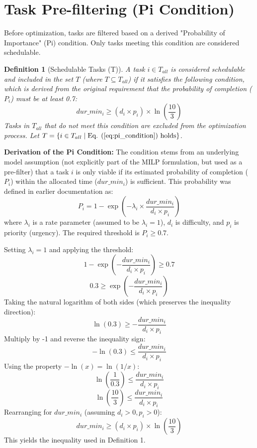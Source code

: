 \documentclass{article}
\newtheorem{definition}{Definition} %
\begin{document}
\section{Task Pre-filtering (Pi Condition)}

Before optimization, tasks are filtered based on a derived "Probability of Importance" (Pi) condition. Only tasks meeting this condition are considered schedulable.

\begin{definition}[Schedulable Tasks (T)]
A task $i \in T_{all}$ is considered schedulable and included in the set $T$ (where $T \subseteq T_{all}$) if it satisfies the following condition, which is derived from the original requirement that the probability of completion ($P_i$) must be at least 0.7:
\begin{equation}
dur\_min_i \ge (d_i \times p_i) \times \ln\left(\frac{10}{3}\right)
\label{eq:pi_condition}\end{equation}
Tasks in $T_{all}$ that do not meet this condition are excluded from the optimization process. Let $T = \{ i \in T_{all} \mid \text{Eq. (\ref{eq:pi_condition}) holds} \}$.
\end{definition}

\textbf{Derivation of the Pi Condition:}
The condition stems from an underlying model assumption (not explicitly part of the MILP formulation, but used as a pre-filter) that a task $i$ is only viable if its estimated probability of completion ($P_i$) within the allocated time ($dur\_min_i$) is sufficient. This probability was defined in earlier documentation as:
\[ P_i = 1 - \exp\left(-\lambda_i \times \frac{dur\_min_i}{d_i \times p_i}\right) \]
where $\lambda_i$ is a rate parameter (assumed to be $\lambda_i = 1$), $d_i$ is difficulty, and $p_i$ is priority (urgency). The required threshold is $P_i \ge 0.7$.

Setting $\lambda_i = 1$ and applying the threshold:
\[ 1 - \exp\left(-\frac{dur\_min_i}{d_i \times p_i}\right) \ge 0.7 \]
\[ 0.3 \ge \exp\left(-\frac{dur\_min_i}{d_i \times p_i}\right) \]
Taking the natural logarithm of both sides (which preserves the inequality direction):
\[ \ln(0.3) \ge -\frac{dur\_min_i}{d_i \times p_i} \]
Multiply by -1 and reverse the inequality sign:
\[ -\ln(0.3) \le \frac{dur\_min_i}{d_i \times p_i} \]
Using the property $-\ln(x) = \ln(1/x)$:
\[ \ln\left(\frac{1}{0.3}\right) \le \frac{dur\_min_i}{d_i \times p_i} \]
\[ \ln\left(\frac{10}{3}\right) \le \frac{dur\_min_i}{d_i \times p_i} \]
Rearranging for $dur\_min_i$ (assuming $d_i > 0, p_i > 0$):
\[ dur\_min_i \ge (d_i \times p_i) \times \ln\left(\frac{10}{3}\right) \]
This yields the inequality used in Definition 1.
\end{document}
